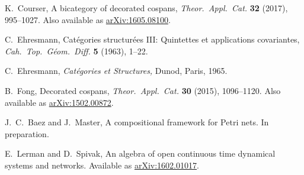 \documentclass{amsart}
\begin{document}
\begin{thebibliography}{100}
 K.\ Courser, A bicategory of decorated cospans, \emph{Theor.\ Appl.\ Cat.} \textbf{32} (2017), 995--1027. Also available as \href{https://arxiv.org/abs/1605.08100}{arXiv:1605.08100}.



 C.\ Ehresmann, Cat\'egories structur\'ees III: Quintettes et applications covariantes,  \textsl{Cah.\ Top.\ G\'eom.\ Diff.} \textbf{5} (1963), 1--22.

 C.\ Ehresmann, {\sl Cat\'egories et Structures,} Dunod, Paris, 1965.

 B.\ Fong, Decorated cospans, \emph{Theor.\ Appl.\ Cat.} \textbf{30} (2015), 1096--1120. Also available as \href{http://arxiv.org/abs/1502.00872}{arXiv:1502.00872}.





 J.\ C.\ Baez and J.\ Master, A compositional framework for Petri nets. In preparation.

 E.\ Lerman and D.\ Spivak, An algebra of open continuous time dynamical systems and networks. Available as \href{http://arxiv.org/abs/1602.01017}{arXiv:1602.01017}.




\end{thebibliography}
\end{document}
